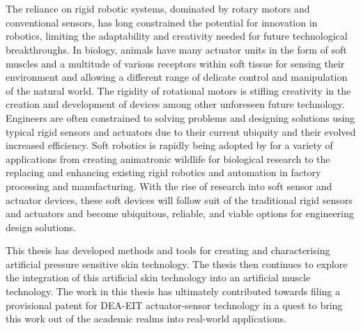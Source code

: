 \chapter{\chapiname}
\label{chapter1}
The reliance on rigid robotic systems, dominated by rotary motors and conventional sensors, has long constrained the potential for innovation in robotics, limiting the adaptability and creativity needed for future technological breakthroughs. In biology, animals have many actuator units in the form of soft muscles and a multitude of various receptors within soft tissue for sensing their environment and allowing a different range of delicate control and manipulation of the natural world. The rigidity of rotational motors is stifling creativity in the creation and development of devices among other unforeseen future technology. Engineers are often constrained to solving problems and designing solutions using typical rigid sensors and actuators due to their current ubiquity and their evolved increased efficiency. Soft robotics is rapidly being adopted by for a variety of applications from creating animatronic wildlife for biological research to the replacing and enhancing existing rigid robotics and automation in factory processing and manufacturing. With the rise of research into soft sensor and actuator devices, these soft devices will follow suit of the traditional rigid sensors and actuators and become ubiquitous, reliable, and viable options for engineering design solutions. 

This thesis has developed methods and tools for creating and characterising artificial pressure sensitive skin technology. The thesis then continues to explore the integration of this artificial skin technology into an artificial muscle technology. The work in this thesis has ultimately contributed towards filing a provisional patent for DEA-EIT actuator-sensor technology in a quest to bring this work out of the academic realms into real-world applications.



